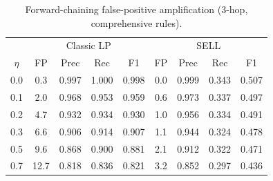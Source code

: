 \begin{table}[t]
  \centering
  \caption{Forward-chaining false-positive amplification (3-hop, comprehensive rules).}
  \label{tab:fp_amplification}
  \begin{tabular}{c|cccc|cccc}
    \toprule
    & \multicolumn{4}{c|}{Classic LP} & \multicolumn{4}{c}{SELL} \\
    $\eta$ & FP & Prec & Rec & F1 & FP & Prec & Rec & F1 \\
    \midrule
    0.0 & 0.3 & 0.997 & 1.000 & 0.998 & 0.0 & 0.999 & 0.343 & 0.507 \\
    0.1 & 2.0 & 0.968 & 0.953 & 0.959 & 0.6 & 0.973 & 0.337 & 0.497 \\
    0.2 & 4.7 & 0.932 & 0.934 & 0.930 & 1.0 & 0.956 & 0.334 & 0.491 \\
    0.3 & 6.6 & 0.906 & 0.914 & 0.907 & 1.1 & 0.944 & 0.324 & 0.478 \\
    0.5 & 9.6 & 0.868 & 0.900 & 0.881 & 2.1 & 0.912 & 0.322 & 0.471 \\
    0.7 & 12.7 & 0.818 & 0.836 & 0.821 & 3.2 & 0.852 & 0.297 & 0.436 \\
    \bottomrule
  \end{tabular}
\end{table}